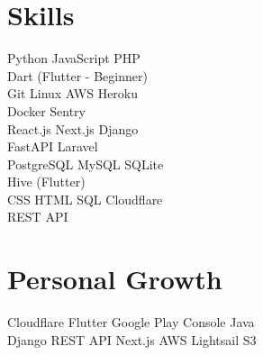 \documentclass[]{deedy-resume-openfont}
\begin{document}
\begin{minipage}[t]{0.33\textwidth}

    \section{Skills}  
    \vspace{4pt}  
    \textbullet{} Python \textbullet{} JavaScript \textbullet{} PHP \\ \textbullet{} Dart (Flutter - Beginner) \\  
    \vspace{6pt}  
    \textbullet{} Git \textbullet{} Linux \textbullet{} AWS \textbullet{} Heroku \\ \textbullet{} Docker \textbullet{} Sentry \\  
    \vspace{6pt}  
    \textbullet{} React.js \textbullet{} Next.js \textbullet{} Django \\ \textbullet{} FastAPI \textbullet{} Laravel \\  
    \vspace{6pt}  
    \textbullet{} PostgreSQL \textbullet{} MySQL \textbullet{} SQLite \\ \textbullet{} Hive (Flutter) \\  
    \vspace{6pt}  
    \textbullet{} CSS \textbullet{} HTML \textbullet{} SQL \textbullet{} Cloudflare \\ \textbullet{} REST API \\  
    \vspace{6pt}  



    \section{Personal Growth}  

    \vspace{6pt}  
    \textbullet{} Cloudflare \textbullet{} Flutter \textbullet{} Google Play Console \textbullet{} Java \\  

    \vspace{8pt}  
    \textbullet{} Django \textbullet{} REST API \textbullet{} Next.js \textbullet{} AWS Lightsail \textbullet{} S3 \\  


\end{minipage}
\end{document}
